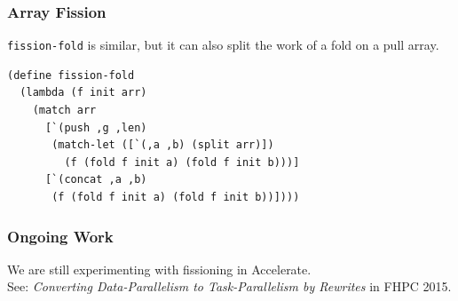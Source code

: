 \documentclass[12pt,letterpaper]{beamer}
\begin{document}
\begin{frame}[fragile]
\frametitle{Array Fission}
{\tt fission-fold} is similar, but it can also split the work 
of a fold on a pull array.
\begin{lstlisting}
(define fission-fold
  (lambda (f init arr)
    (match arr
      [`(push ,g ,len)
       (match-let ([`(,a ,b) (split arr)])
         (f (fold f init a) (fold f init b)))]
      [`(concat ,a ,b)
       (f (fold f init a) (fold f init b))])))
\end{lstlisting}
\end{frame}

\begin{frame}
  \frametitle{Ongoing Work}
  We are still experimenting with fissioning in Accelerate. \\
  See: {\em Converting Data-Parallelism to Task-Parallelism by Rewrites} in FHPC 2015.
\end{frame}
\end{document}
